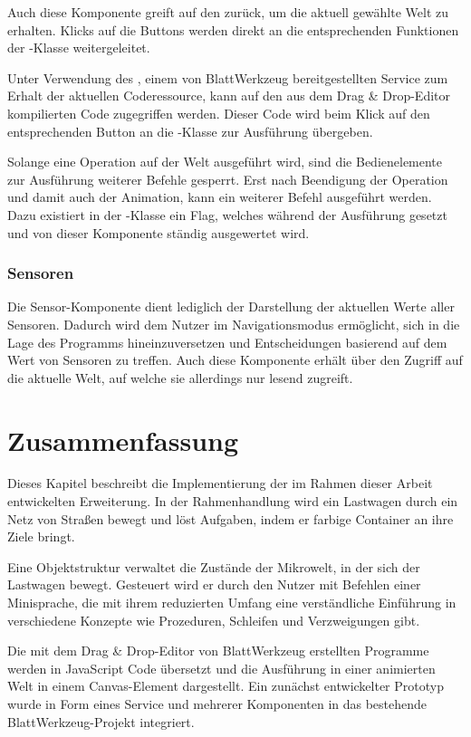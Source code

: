 Auch diese Komponente greift auf den  zurück, um die aktuell gewählte Welt zu erhalten. Klicks auf die Buttons werden direkt an die entsprechenden Funktionen der -Klasse weitergeleitet.

Unter Verwendung des , einem von BlattWerkzeug bereitgestellten Service zum Erhalt der aktuellen Coderessource, kann auf den aus dem Drag \& Drop-Editor kompilierten Code zugegriffen werden. Dieser Code wird beim Klick auf den entsprechenden Button an die -Klasse zur Ausführung übergeben.

Solange eine Operation auf der Welt ausgeführt wird, sind die Bedienelemente zur Ausführung weiterer Befehle gesperrt. Erst nach Beendigung der Operation und damit auch der Animation, kann ein weiterer Befehl ausgeführt werden. Dazu existiert in der -Klasse ein Flag, welches während der Ausführung gesetzt und von dieser Komponente ständig ausgewertet wird.

\subsubsection{Sensoren}
\label{sec:implementation:integration:sensors}

Die Sensor-Komponente dient lediglich der Darstellung der aktuellen Werte aller Sensoren. Dadurch wird dem Nutzer im Navigationsmodus ermöglicht, sich in die Lage des Programms hineinzuversetzen und Entscheidungen basierend auf dem Wert von Sensoren zu treffen. Auch diese Komponente erhält über den  Zugriff auf die aktuelle Welt, auf welche sie allerdings nur lesend zugreift.

\section{Zusammenfassung}
\label{sec:implementation:summary}

Dieses Kapitel beschreibt die Implementierung der im Rahmen dieser Arbeit entwickelten Erweiterung. In der Rahmenhandlung wird ein Lastwagen durch ein Netz von Straßen bewegt und löst Aufgaben, indem er farbige Container an ihre Ziele bringt.

Eine Objektstruktur verwaltet die Zustände der Mikrowelt, in der sich der Lastwagen bewegt. Gesteuert wird er durch den Nutzer mit Befehlen einer Minisprache, die mit ihrem reduzierten Umfang eine verständliche Einführung in verschiedene Konzepte wie Prozeduren, Schleifen und Verzweigungen gibt.

Die mit dem Drag \& Drop-Editor von BlattWerkzeug erstellten Programme werden in JavaScript Code übersetzt und die Ausführung in einer animierten Welt in einem Canvas-Element dargestellt. Ein zunächst entwickelter Prototyp wurde in Form eines Service und mehrerer Komponenten in das bestehende BlattWerkzeug-Projekt integriert.

